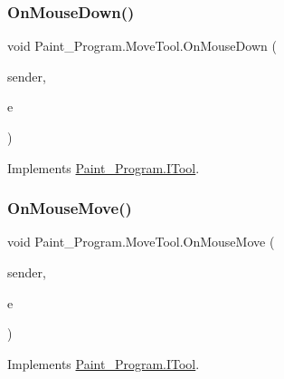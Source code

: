 \subsubsection{\texorpdfstring{On\+Mouse\+Down()}{OnMouseDown()}}
{\footnotesize\ttfamily void Paint\+\_\+\+Program.\+Move\+Tool.\+On\+Mouse\+Down (\begin{DoxyParamCaption}\item[{object}]{sender,  }\item[{Mouse\+Event\+Args}]{e }\end{DoxyParamCaption})\hspace{0.3cm}{\ttfamily [inline]}}



Implements \mbox{\hyperlink{interface_paint___program_1_1_i_tool_a73d8797f4f2b1e0d8efe8aadcd44e840}{Paint\+\_\+\+Program.\+I\+Tool}}.

\mbox{\label{class_paint___program_1_1_move_tool_ad5062cb79928744a0b394f927eb4a41d}} 
\subsubsection{\texorpdfstring{On\+Mouse\+Move()}{OnMouseMove()}}
{\footnotesize\ttfamily void Paint\+\_\+\+Program.\+Move\+Tool.\+On\+Mouse\+Move (\begin{DoxyParamCaption}\item[{object}]{sender,  }\item[{Mouse\+Event\+Args}]{e }\end{DoxyParamCaption})\hspace{0.3cm}{\ttfamily [inline]}}



Implements \mbox{\hyperlink{interface_paint___program_1_1_i_tool_a6a1cbe840b5cfc8a9b9463cc21590845}{Paint\+\_\+\+Program.\+I\+Tool}}.

\mbox{\label{class_paint___program_1_1_move_tool_a64daa79217e1cadfa6ddc865369298ba}} 
